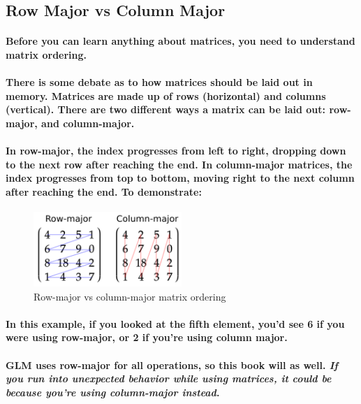 \subsection{Row Major vs Column Major}
\paragraph{
    Before you can learn anything about matrices, you need to understand matrix ordering.
}

\paragraph{
    There is some debate as to how matrices should be laid out in memory. Matrices are made up of rows (horizontal) and columns (vertical). There are two different ways a matrix can be laid out: row-major, and column-major.
}

\paragraph{
    In row-major, the index progresses from left to right, dropping down to the next row after reaching the end. In column-major matrices, the index progresses from top to bottom, moving right to the next column after reaching the end. To demonstrate:
}

\begin{frame}{}
    \begin{figure}[ht]
      \centering
      \includegraphics[width=0.5\textwidth]{images/chap2/RowVsColumn.png}
      \caption{Row-major vs column-major matrix ordering}
      \label{fig:row_vs_column}
    \end{figure}
\end{frame}

\paragraph{
    In this example, if you looked at the fifth element, you'd see 6 if you were using row-major, or 2 if you're using column major.
}

\paragraph{
    GLM uses row-major for all operations, so this book will as well. \emph{If you run into unexpected behavior while using matrices, it could be because you're using column-major instead}.
}

